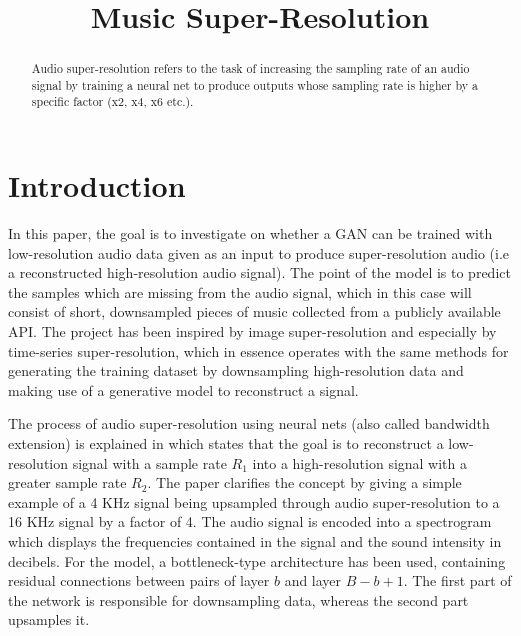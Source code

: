 \documentclass[conference]{IEEEtran}
\begin{document}
\title{Music Super-Resolution\\
}

\author{
}

\maketitle

\begin{abstract}
Audio super-resolution refers to the task of increasing the sampling rate of an audio signal by training a neural net to produce outputs whose sampling rate is higher by a specific factor (x2, x4, x6 etc.).
\end{abstract}

\section{Introduction}
	In this paper, the goal is to investigate on whether a GAN can be trained with low-resolution audio data given as an input to produce super-resolution audio (i.e a reconstructed high-resolution audio signal). The point of the model is to predict the samples which are missing from the audio signal, which in this case will consist of short, downsampled pieces of music collected from a publicly available API. The project has been inspired by image super-resolution and especially by time-series super-resolution, which in essence operates with the same methods for generating the training dataset by downsampling high-resolution data and making use of a generative model to reconstruct a signal. 

	The process of audio super-resolution using neural nets (also called bandwidth extension) is explained in \textcite{kuleshov2017audio} which states that the goal is to reconstruct a low-resolution signal with a sample rate $ R_{1} $ into a high-resolution signal with a greater sample rate $ R_{2} $. The paper clarifies the concept by giving a simple example of a 4 KHz signal being upsampled through audio super-resolution to a 16 KHz signal by a factor of 4. The audio signal is encoded into a spectrogram which displays the frequencies contained in the signal and the sound intensity in decibels. For the model, a bottleneck-type architecture has been used, containing residual connections between pairs of layer $ b $ and layer $ B - b + 1 $. The first part of the network is responsible for downsampling data, whereas the second part upsamples it.
		
\printbibliography
\vspace{12pt}
\end{document}
